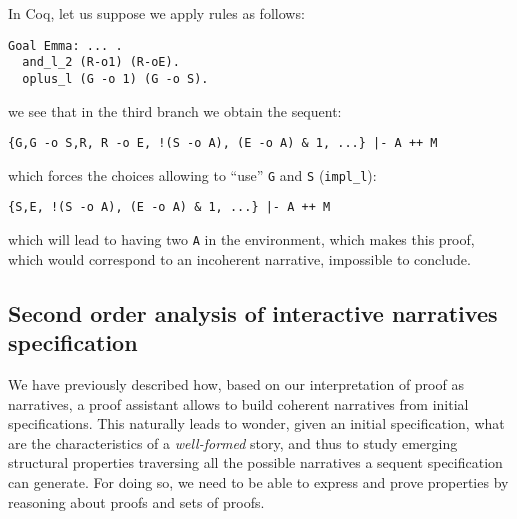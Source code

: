 \documentclass[runningheads,a4paper]{llncs}
\begin{document}
In Coq, let us suppose we apply rules as follows:
\begin{lstlisting}
Goal Emma: ... .
  and_l_2 (R-o1) (R-oE).
  oplus_l (G -o 1) (G -o S).
\end{lstlisting}
we see that in the third branch we obtain the sequent:
\begin{lstlisting}
{G,G -o S,R, R -o E, !(S -o A), (E -o A) & 1, ...} |- A ++ M
\end{lstlisting}
which forces the choices allowing to ``use'' \texttt{G} and \texttt{S}
(\lstinline!impl_l!):
\begin{lstlisting}
{S,E, !(S -o A), (E -o A) & 1, ...} |- A ++ M
\end{lstlisting}
which will lead to having two \texttt{A} in the environment, which
makes this proof, which would correspond to an incoherent narrative, impossible to conclude.
\subsection{Second order analysis of interactive narratives specification}
\label{sec:second-order-analys}
%
We have previously described how, based on our interpretation of proof as narratives, a proof assistant allows to build coherent narratives from initial specifications. This naturally leads to wonder, given an initial specification,  what are the characteristics of a \emph{well-formed} story, and thus to study emerging structural properties traversing all the possible narratives a sequent specification can generate. For doing so, we need to be able to express and prove properties by reasoning about proofs and sets of proofs. 
\end{document}
